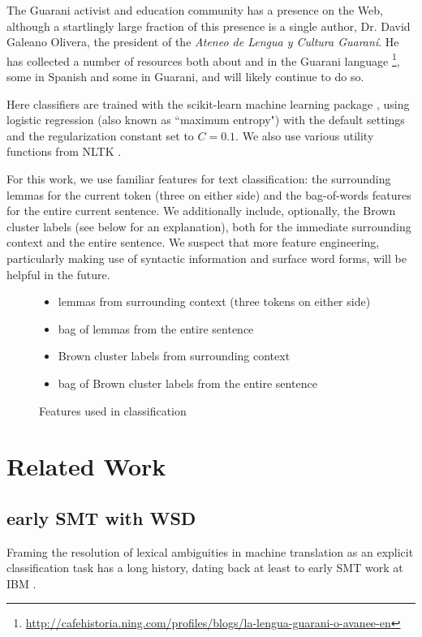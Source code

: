 The Guarani activist and education community has a presence on the Web,
although a startlingly large fraction of this presence is a single author,
Dr. David Galeano Olivera, the president of the \emph{Ateneo de Lengua y
Cultura Guaraní}. He has collected a number of resources both about and in the
Guarani language
\footnote{\url{http://cafehistoria.ning.com/profiles/blogs/la-lengua-guarani-o-avanee-en}},
some in Spanish and some in Guarani, and will likely continue to do so.





Here classifiers are trained with the scikit-learn machine learning package
\cite{scikit-learn}, using logistic regression (also known as ``maximum
entropy") with the default settings and the regularization constant set to
$C=0.1$. We also use various utility functions from NLTK \cite{nltkbook}. 

For this work, we use familiar features for text classification: the
surrounding lemmas for the current token (three on either side) and the
bag-of-words features for the entire current sentence. We additionally include,
optionally, the Brown cluster labels (see below for an explanation),
both for the immediate surrounding context and the entire sentence.
We suspect that more feature engineering, particularly making use of syntactic
information and surface word forms, will be helpful in the future.

\begin{figure}[t!]
  \begin{itemize}
    \item lemmas from surrounding context (three tokens on either side)
    \item bag of lemmas from the entire sentence
    \item Brown cluster labels from surrounding context
    \item bag of Brown cluster labels from the entire sentence
  \end{itemize}
\caption{Features used in classification}
\label{fig:features}
\end{figure}

\section{Related Work}

\subsection{early SMT with WSD}
Framing the resolution of lexical ambiguities in machine translation
as an explicit classification
task has a long history, dating back at least to early SMT work at IBM
\cite{Brown91word-sensedisambiguation}.

